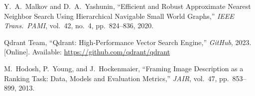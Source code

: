 \documentclass[12pt,a4paper,oneside]{report}
\begin{document}
\begin{enumerate}[label={[\arabic*]}, leftmargin=2.2em]
\item Y.~A.~Malkov and D.~A.~Yashunin,
  ``Efficient and Robust Approximate Nearest Neighbor Search Using
  Hierarchical Navigable Small World Graphs,''
  \textit{IEEE Trans.\ PAMI}, vol.~42, no.~4, pp.~824--836, 2020.

\item Qdrant Team,
  ``Qdrant: High-Performance Vector Search Engine,''
  \textit{GitHub}, 2023.
  [Online]. Available: \url{https://github.com/qdrant/qdrant}

\item M.~Hodosh, P.~Young, and J.~Hockenmaier,
  ``Framing Image Description as a Ranking Task: Data, Models and
  Evaluation Metrics,''
  \textit{JAIR}, vol.~47, pp.~853--899, 2013.

\end{enumerate}
\end{document}
